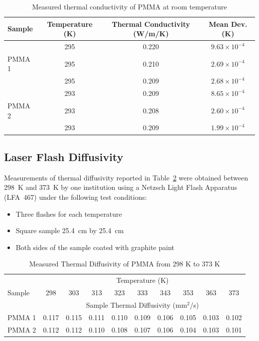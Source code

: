 \documentclass{book}
\begin{document}
\begin{table}[ht]
\caption{Measured thermal conductivity of PMMA at room temperature}
\label{Table_14}
\begin{center}
\begin{tabular}{|l|ccc|}
\hline
Sample    & Temperature (K) & Thermal Conductivity (W/m/K) & Mean Dev. (K)        \\ \hline
          & 295             & 0.220                        & $9.63\times10^{-4}$  \\
PMMA 1    & 295             & 0.210                        & $2.69\times10^{-4}$  \\
          & 295             & 0.209                        & $2.68\times10^{-4}$  \\ \hline & 293             & 0.209                        & $8.65\times10^{-4}$  \\
PMMA 2    & 293             & 0.208                        & $2.60\times10^{-4}$  \\
          & 293             & 0.209                        & $1.99\times10^{-4}$  \\ \hline
\end{tabular}
\end{center}
\end{table}


\subsection{Laser Flash Diffusivity}

Measurements of thermal diffusivity reported in Table~\ref{Table_15} were obtained between 298~K and 373~K by one institution using a Netzsch Light Flash Apparatus (LFA~467) under the following test conditions:
\begin{itemize}
 \item Three flashes for each temperature
 \item Square sample 25.4~cm by 25.4~cm
 \item Both sides of the sample coated with graphite paint
\end{itemize}

\begin{table}[ht]
\caption{Measured Thermal Diffusivity of PMMA from 298 K to 373 K}
\label{Table_15}
\begin{center}
\begin{tabular}{|l|ccccccccc|}
\hline
        & \multicolumn{9}{|c|}{Temperature (K)}                                 \\ \cline{2-10}
Sample  & 298  & 303  & 313  & 323  & 333  & 343  & 353  & 363  & 373           \\ \cline{2-10}
        & \multicolumn{9}{|c|}{Sample Thermal Diffusivity (mm$^2$/s)}           \\ \hline
PMMA 1  & 0.117 & 0.115 & 0.111 & 0.110 & 0.109 & 0.106 & 0.105 & 0.103 & 0.102 \\
PMMA 2  & 0.112 & 0.112 & 0.110 & 0.108 & 0.107 & 0.106 & 0.104 & 0.103 & 0.101 \\ \hline
\end{tabular}
\end{center}
\end{table}
\end{document}
